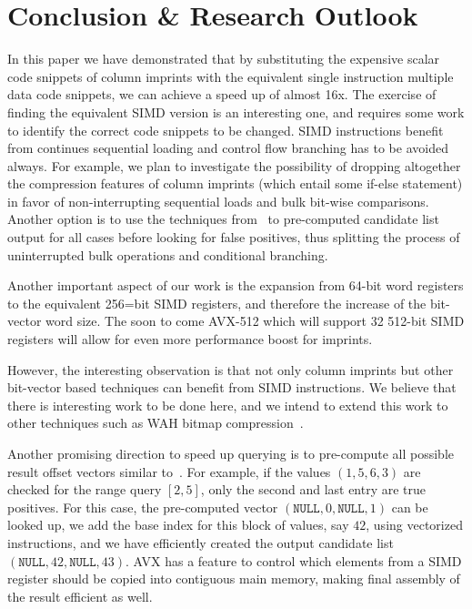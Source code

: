 \documentclass[sigconf]{acmart}
\begin{document}
\section{Conclusion \& Research Outlook}\label{sec:conclusion}

In this paper we have demonstrated that by substituting the expensive scalar code snippets of column imprints with the equivalent single instruction multiple data code snippets, we can achieve a speed up of almost 16x. The exercise of finding the equivalent SIMD version is an interesting one, and requires some work to identify the correct code snippets to be changed. SIMD instructions
benefit from continues sequential loading and control flow branching has to be avoided always. For example, we plan to investigate the possibility of dropping altogether the compression features of column imprints (which entail some if-else statement) in favor of non-interrupting sequential loads and bulk bit-wise comparisons. Another option is to use the techniques from~\cite{DBLP:conf/sigmod/LangMFB0K16} to pre-computed candidate list output for all cases before looking for false positives, thus splitting the process of uninterrupted bulk operations and conditional branching.

Another important aspect of our work is the expansion from 64-bit word registers to the equivalent 256=bit SIMD registers, and therefore the increase of the bit-vector word size.
The soon to come AVX-512 which will support 32 512-bit SIMD registers will allow for even more performance boost for imprints.

However, the interesting observation is that not only column imprints but other bit-vector based techniques can benefit from SIMD instructions. We believe that there is interesting work to be done here, and we intend to extend this work to other techniques such as WAH bitmap compression~\cite{Wu:2006:OBI:1132863.1132864}. 

Another promising direction to speed up querying is to pre-compute all possible result offset vectors similar to~\cite{DBLP:conf/sigmod/LangMFB0K16}. For example, if the values $(1,5,6,3)$ are checked for the range query $[2,5]$, only the second and last entry are true positives. For this case, the pre-computed vector $(\mathtt{NULL}, 0, \mathtt{NULL}, 1)$ can be looked up, we add the base index for this block of values, say $42$, using vectorized instructions, and we have efficiently created the output candidate list $(\mathtt{NULL}, 42, \mathtt{NULL}, 43)$. AVX has a feature to control which elements from a SIMD register should be copied into contiguous main memory, making final assembly of the result efficient as well.
\end{document}
